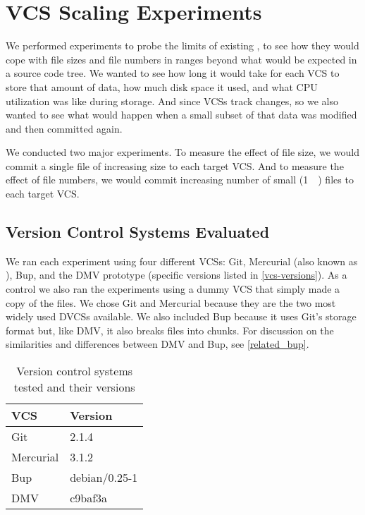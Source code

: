 \chapter{VCS Scaling Experiments}
\label{file-size-exp-desc}
\label{num-files-exp-desc}


We performed experiments to probe the limits of existing , to see
how they would cope with file sizes and file numbers in ranges beyond what would
be expected in a source code tree. We wanted to see how long it would take for
each \gls{VCS} to store that amount of data, how much disk space it used, and
what CPU utilization was like during storage. And since \glspl{VCS} track
changes, so we also wanted to see what would happen when a small subset of that
data was modified and then committed again.

We conducted two major experiments. To measure the effect of file size, we would
\gls{commit} a single file of increasing size to each target \gls{VCS}. And to
measure the effect of file numbers, we would \gls{commit} increasing number of
small (\SI{1}{\kibi\byte}) files to each target \gls{VCS}.



\section{Version Control Systems Evaluated}

We ran each experiment using four different \glspl{VCS}: Git, Mercurial (also
known as ), Bup, and the \gls{DMV} prototype (specific versions
listed in \autoref{vcs-versions}). As a control we also ran the experiments
using a dummy \gls{VCS} that simply made a copy of the files. We chose Git and
Mercurial because they are the two most widely used \glspl{DVCS} available. We
also included Bup because it uses Git's storage format but, like \gls{DMV}, it
also breaks files into chunks. For discussion on the similarities and
differences between \gls{DMV} and Bup, see \autoref{related_bup}.


\begin{table}
    \caption{Version control systems tested and their versions}
    \label{vcs-versions}
    \centering
    \begin{tabular}{ l l }
        VCS & Version \\
        \midrule
        Git & 2.1.4 \\
        Mercurial & 3.1.2 \\
        Bup & debian/0.25-1 \\
        DMV & c9baf3a \\
    \end{tabular}
\end{table}


